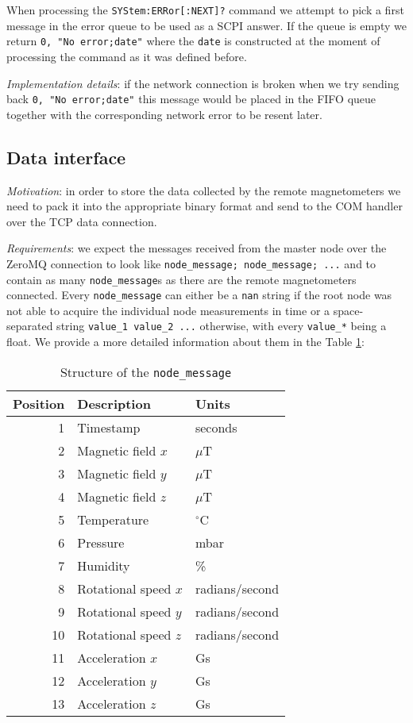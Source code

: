When processing the  \texttt{SYStem:ERRor[:NEXT]?} command we attempt to pick a first message in the error queue to be used as a SCPI answer. If the queue is empty we return \texttt{0, "No error;date"} where the \texttt{date} is constructed at the moment of processing the command as it was defined before.

\textit{Implementation details}: if the network connection is broken when we try sending back \texttt{0, "No error;date"} this message would be placed in the FIFO queue together with the corresponding network error to be resent later.

\subsection{Data interface}
\label{subsec:rm-proxy_data}

\textit{Motivation}: in order to store the data collected by the remote magnetometers we need to pack it into the appropriate \cite{Bison2018} binary format and send to the COM handler over the TCP data connection.

\textit{Requirements}: we expect the messages received from the master node over the ZeroMQ connection to look like \texttt{node\_message; node\_message; ...} and to contain as many \texttt{node\_message}s as there are the remote magnetometers connected. Every \texttt{node\_message} can either be a \texttt{nan} string if the root node was not able to acquire the individual node measurements in time or a space-separated string \texttt{value\_1 value\_2 ...} otherwise, with every \texttt{value\_*} being a float. We provide a more detailed information about them in the Table \ref{tbl:node_message}:

\begin{table}[h]
\centering
\begin{tabular}{|r|l|l|}
	\hline
	Position & Description & Units \\
	\hline \hline
	1 & Timestamp & seconds \\
	\hline
	2 & Magnetic field $x$ & $\mu$T \\
	\hline
	3 & Magnetic field $y$ & $\mu$T \\
	\hline
	4 & Magnetic field $z$ & $\mu$T \\
	\hline
	5 & Temperature & $^\circ$C \\
	\hline
	6 & Pressure & mbar \\
	\hline
	7 & Humidity & \% \\
	\hline
	8 & Rotational speed $x$ & radians/second \\
	\hline
	9 & Rotational speed $y$ & radians/second \\
	\hline
	10 & Rotational speed $z$ & radians/second \\
	\hline
	11 & Acceleration $x$ & Gs \\
	\hline
	12 & Acceleration $y$ & Gs \\
	\hline
	13 & Acceleration $z$ & Gs \\
	\hline
\end{tabular}
\caption{Structure of the \texttt{node\_message}}
\label{tbl:node_message}
\end{table}

